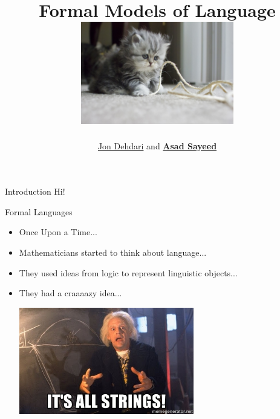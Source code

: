 \documentclass{beamer}
\begin{document}
\title{Formal Models of Language \\[1.5em]
 \includegraphics[width=0.5\textwidth]{images/kitten_string_flickr_albaraa.jpg} \\[-1.0em]
 }
\author{\href{http://jon.dehdari.org}{Jon Dehdari} and \href{http://www.coli.uni-saarland.de/\~asayeed}{\textbf{Asad Sayeed}}}
\frame{\titlepage}

\begin{frame}{Introduction}
Hi!
\end{frame}

\begin{frame}{Formal Languages}
\begin{block}{}
\begin{itemize}
	\item Once Upon a Time...
	\pause
	\item Mathematicians started to think about language...
	\pause
	\item They used ideas from logic to represent linguistic objects...
	\pause
	\item They had a craaaazy idea... \\
	\pause
	\begin{center}
	\includegraphics[width=0.6\textwidth]{images/doc_brown_strings.jpg}
	\end{center}
\end{itemize}
\end{block}
\end{frame}
\end{document}
